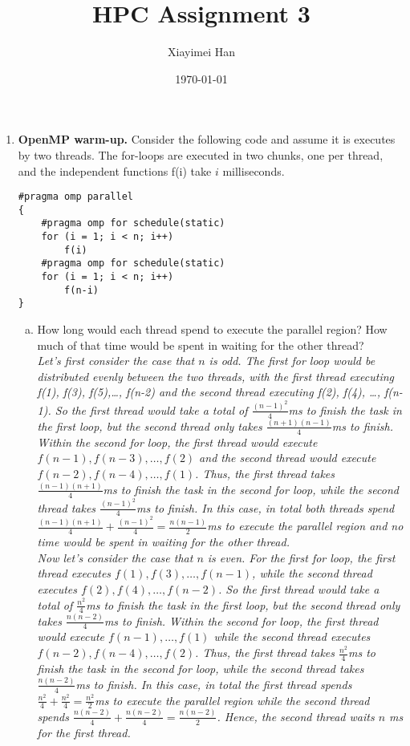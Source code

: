 \documentclass{article}
\title{HPC Assignment 3}
\author{Xiayimei Han}
\date{\today}
\begin{document}
\maketitle

\begin{enumerate}
    \item \textbf{OpenMP warm-up.} Consider the following code and assume it is executes by two threads. The for-loops are executed in two chunks, one per thread, and the independent functions f(i) take $i$ milliseconds. 
    \begin{verbatim}
#pragma omp parallel
{
    #pragma omp for schedule(static)
    for (i = 1; i < n; i++)
        f(i)
    #pragma omp for schedule(static)
    for (i = 1; i < n; i++)
        f(n-i)
}
    \end{verbatim} 

\begin{enumerate}[(a)]
    \item How long would each thread spend to execute the parallel region? How much of that time would be spent in waiting for the other thread? 
    \\\textit{Let's first consider the case that $n$ is odd. The first for loop would be distributed evenly between the two threads, with the first thread executing f(1), f(3), f(5),\ldots, f(n-2) and the second thread executing f(2), f(4), \ldots, f(n-1). So the first thread would take a total of $\frac{(n-1)^2}{4}$ms to finish the task in the first loop, but the second thread only takes $\frac{(n+1)(n-1)}{4}$ms to finish. Within the second for loop, the first thread would execute $f(n-1), f(n-3), \ldots, f(2)$ and the second thread would execute $f(n-2), f(n-4),\ldots, f(1)$. Thus, the first thread takes $\frac{(n-1)(n+1)}{4}$ms to finish the task in the second for loop, while the second thread takes $\frac{(n-1)^2}{4}$ms to finish. In this case, in total both threads spend $\frac{(n-1)(n+1)}{4}+\frac{(n-1)^2}{4}=\frac{n(n-1)}{2}$ms to execute the parallel region and no time would be spent in waiting for the other thread. \\Now let's consider the case that $n$ is even. For the first for loop, the first thread executes $f(1), f(3), \ldots, f(n-1)$, while the second thread executes $f(2), f(4), \ldots, f(n-2)$. So the first thread would take a total of $\frac{n^2}{4}$ms to finish the task in the first loop, but the second thread only takes $\frac{n(n-2)}{4}$ms to finish. Within the second for loop, the first thread would execute $f(n-1), \ldots, f(1)$ while the second thread executes $f(n-2), f(n-4), \ldots, f(2)$. Thus, the first thread takes $\frac{n^2}{4}$ms to finish the task in the second for loop, while the second thread takes $\frac{n(n-2)}{4}$ms to finish. In this case, in total the first thread spends $\frac{n^2}{4}+\frac{n^2}{4}=\frac{n^2}{2}$ms to execute the parallel region while the second thread spends $\frac{n(n-2)}{4}+\frac{n(n-2)}{4} = \frac{n(n-2)}{2}$. Hence, the second thread waits $n$ ms for the first thread.}


\end{enumerate}
\end{enumerate}
\end{document}
